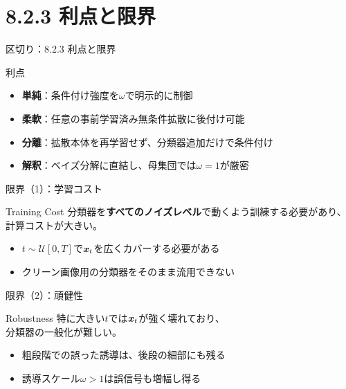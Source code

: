 \section{8.2.3 利点と限界}
\asmain
\begin{frame}{区切り：8.2.3 利点と限界}
    \tableofcontents[currentsection]
\end{frame}
\asmain
\begin{frame}{利点}
    \begin{itemize}
        \item \textbf{単純}：条件付け強度を$\omega$で明示的に制御
        \item \textbf{柔軟}：任意の事前学習済み無条件拡散に後付け可能
        \item \textbf{分離}：拡散本体を再学習せず、分類器追加だけで条件付け
        \item \textbf{解釈}：ベイズ分解に直結し、母集団では$\omega=1$が厳密
    \end{itemize}
\end{frame}
\asmain
\begin{frame}{限界（1）：学習コスト}
    \begin{alertblock}{Training Cost}
        分類器を\textbf{すべてのノイズレベル}で動くよう訓練する必要があり、\\
        計算コストが大きい。
    \end{alertblock}
    \begin{itemize}
        \item $t\sim\mathcal{U}[0,T]$で$\bm{x}_t$を広くカバーする必要がある
        \item クリーン画像用の分類器をそのまま流用できない
    \end{itemize}
\end{frame}
\asmain
\begin{frame}{限界（2）：頑健性}
    \begin{alertblock}{Robustness}
        特に大きい$t$では$\bm{x}_t$が強く壊れており、\\
        分類器の一般化が難しい。
    \end{alertblock}
    \begin{itemize}
        \item 粗段階での誤った誘導は、後段の細部にも残る
        \item 誘導スケール$\omega>1$は誤信号も増幅し得る
    \end{itemize}
\end{frame}
